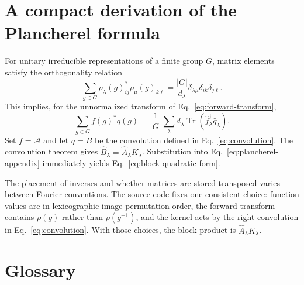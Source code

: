 \documentclass[11pt,a4paper]{article}
\newcommand{\Tr}{\operatorname{Tr}}
\newcommand{\cA}{\mathcal{A}}
\begin{document}
\appendix

\section{A compact derivation of the Plancherel formula}

For unitary irreducible representations of a finite group $G$, matrix
elements satisfy the orthogonality relation
\begin{equation}
  \sum_{g\in G}
  \rho_\lambda(g)_{ij}^*
  \rho_\mu(g)_{k\ell}
  =\frac{|G|}{d_\lambda}
   \delta_{\lambda\mu}\delta_{ik}\delta_{j\ell}.
  \label{eq:matrix-element-orthogonality}
\end{equation}
This implies, for the unnormalized transform of
Eq.~\eqref{eq:forward-transform},
\begin{equation}
  \sum_{g\in G} f(g)^*q(g)
  =\frac{1}{|G|}
   \sum_\lambda d_\lambda
   \Tr\!\left(\widehat f_\lambda^\dagger
               \widehat q_\lambda\right).
  \label{eq:plancherel-appendix}
\end{equation}
Set $f=\cA$ and let $q=B$ be the convolution defined in
Eq.~\eqref{eq:convolution}.  The convolution theorem gives
$\widehat B_\lambda=\widehat A_\lambda K_\lambda$.  Substitution into
Eq.~\eqref{eq:plancherel-appendix} immediately yields
Eq.~\eqref{eq:block-quadratic-form}.

The placement of inverses and whether matrices are stored transposed varies
between Fourier conventions.  The source code fixes one consistent choice:
function values are in lexicographic image-permutation order, the forward
transform contains $\rho(g)$ rather than $\rho(g^{-1})$, and the kernel
acts by the right convolution in Eq.~\eqref{eq:convolution}.  With those
choices, the block product is $\widehat A_\lambda K_\lambda$.

\section{Glossary}
\end{document}
